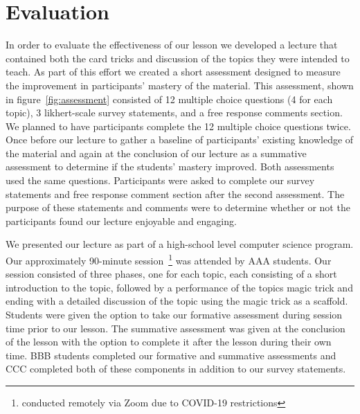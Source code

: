 \section{Evaluation}
\label{SEC:evaluation}

In order to evaluate the effectiveness of our lesson we developed a lecture
that contained both the card tricks and discussion of the topics they were
intended to teach.  As part of this effort we created a short assessment
designed to measure the improvement in participants' mastery of the material.
This assessment, shown in figure~\ref{fig:assessment}
consisted of 12 multiple choice questions (4 for each topic),
3 likhert-scale survey statements,
and a free response comments section.
We planned to have participants complete the 12 multiple choice questions twice.
Once before our lecture to gather a baseline of
participants' existing knowledge of the material and again at the conclusion of our
lecture as a summative assessment to determine if the students' mastery
improved.  Both assessments used the same questions.
Participants were asked to complete our survey statements and
free response comment section after the second assessment.  The purpose of
these statements and comments were to determine whether or not the
participants found our lecture enjoyable and engaging.

We presented our lecture as part of a high-school level computer science
program.
Our approximately 90-minute session~\footnote{conducted remotely
via Zoom due to COVID-19 restrictions} was attended by AAA students.
Our session consisted of three phases, one for each topic, each consisting
of a short introduction to the topic,
followed by a performance of the topics magic trick
and ending with a detailed discussion of the topic
using the magic trick as a scaffold.
Students were given the option to take our formative assessment
during session time prior to our lesson.
The summative assessment was given at the conclusion of the lesson
with the option to complete it after the lesson during their own time.
BBB students completed our formative and summative assessments and CCC
completed both of these components in addition to our survey statements.







